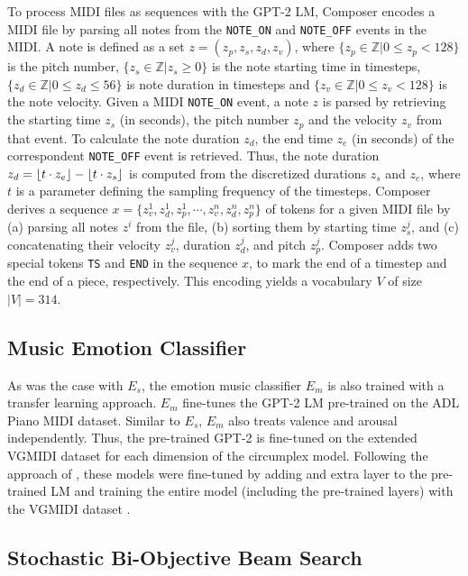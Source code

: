 To process MIDI files as sequences with the GPT-2 LM, Composer encodes a MIDI file by parsing all notes from the \texttt{NOTE\_ON} and \texttt{NOTE\_OFF} events in the MIDI. A note is defined as a set $z = (z_p, z_s, z_d, z_v)$, where $\{z_p \in \mathbb{Z} \vert 0 \leq z_p < 128 \}$ is the pitch number, $\{z_s \in \mathbb{Z} \vert z_s \geq 0 \}$ is the note starting time in timesteps,  $\{z_d \in \mathbb{Z} \vert 0 \leq z_d \leq 56\}$ is note duration in timesteps and $\{z_v \in \mathbb{Z} \vert 0 \leq z_v < 128 \}$ is the note velocity. Given a MIDI \texttt{NOTE\_ON} event, a note $z$ is parsed by retrieving the starting time $z_s$ (in seconds), the pitch number $z_p$ and the velocity $z_v$ from that event. To calculate the note duration $z_d$, the end time $z_e$ (in seconds) of the correspondent \texttt{NOTE\_OFF} event is retrieved. Thus, the note duration $z_d = \lfloor t \cdot z_e\rfloor - \lfloor t \cdot z_s\rfloor$ is computed from the  discretized durations $z_s$ and $z_e$, where $t$ is a parameter defining the sampling frequency of the timesteps. Composer derives a sequence $x = \{z_v^1, z_{d}^1, z_{p}^1, \cdots, z_v^n, z_{d}^n, z_p^n\}$ of tokens for a given MIDI file by (a) parsing all notes $z^i$ from the file, (b) sorting them by starting time $z_s^j$, and (c) concatenating their velocity $z_v^j$, duration $z_d^j$, and pitch $z_p^j$. Composer adds two special tokens \texttt{TS} and \texttt{END} in the sequence $x$, to mark the end of a timestep and the end of a piece, respectively. This encoding yields a vocabulary $V$ of size $|V| = 314$.

\subsection{Music Emotion Classifier}

As was the case with $E_s$, the emotion music classifier $E_m$ is also trained with a transfer learning approach. $E_m$ fine-tunes the GPT-2 LM pre-trained on the ADL Piano MIDI dataset. Similar to $E_s$, $E_m$ also treats valence and arousal independently. Thus, the pre-trained GPT-2 is fine-tuned on the extended VGMIDI dataset for each dimension of the circumplex model. Following the approach of \citet{Radford2018}, these models were fine-tuned by adding and extra layer to the pre-trained LM and training the entire model (including the pre-trained layers) with the VGMIDI dataset \cite{ferreira_2019}.

\subsection{Stochastic Bi-Objective Beam Search}

